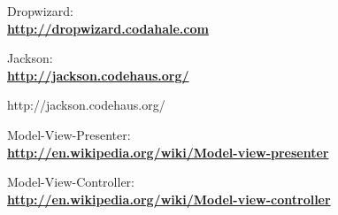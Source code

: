\begin{thebibliography}{1}
 Dropwizard:\\
\textbf{ \url{http://dropwizard.codahale.com}}

 Jackson:\\
\textbf{ \url{http://jackson.codehaus.org/}}

http://jackson.codehaus.org/

 Model-View-Presenter:\\
\textbf{ \url{http://en.wikipedia.org/wiki/Model-view-presenter}}

 Model-View-Controller:\\
\textbf{ \url{http://en.wikipedia.org/wiki/Model-view-controller}}

\end{thebibliography}
